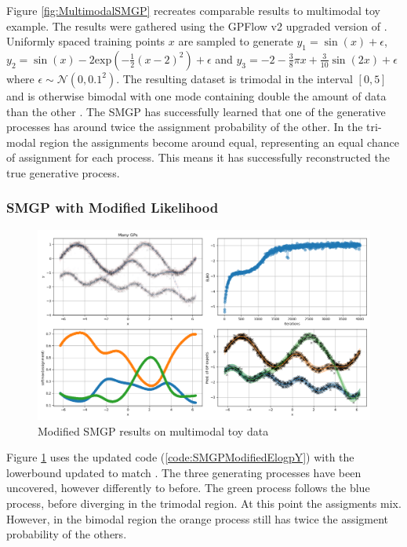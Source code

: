 \documentclass[12pt,a4paper]{report}
\theoremstyle{definition}
\begin{document}
Figure \ref{fig:MultimodalSMGP} recreates comparable results to \citet{Kaiser2020} multimodal toy example.
The results were gathered using the GPFlow v2 upgraded version of \citet{Lui2021}.
Uniformly spaced training points $x$ are sampled to generate $y_{1} = \sin (x) + \epsilon$, $y_{2} = \sin(x) - 2 \textrm{exp}(-\frac{1}{2}(x - 2)^2) + \epsilon$ and $y_{3} = -2 -\frac{3}{8}\pi x + \frac{3}{10} \sin(2x) + \epsilon$ where $\epsilon \sim \mathcal{N}(0, 0.1^2)$. 
The resulting dataset is trimodal in the interval $[0, 5]$ and is otherwise bimodal with one mode containing double the amount of data than the other \citep{Kaiser2020}.
The SMGP has successfully learned that one of the generative processes has around twice the assignment probability of the other.
In the tri-modal region the assignments become around equal, representing an equal chance of assignment for each process. This means it has successfully reconstructed the true generative process.

\subsubsection{SMGP with Modified Likelihood}

\begin{figure}[H]
    \centering
    \includegraphics[width=\linewidth]{demo_tf2_modified.png}
    \caption{Modified SMGP results on multimodal toy data}
    \label{fig:MultimodalSMGPModified}
\end{figure}

Figure \ref{fig:MultimodalSMGPModified} uses the updated code (\ref{code:SMGPModifiedElogpY}) with the lowerbound updated to match \citet{Kaiser2020}.
The three generating processes have been uncovered, however differently to before.
The green process follows the blue process, before diverging in the trimodal region.
At this point the assigments mix. 
However, in the bimodal region the orange process still has twice the assigment probability of the others.
\end{document}

